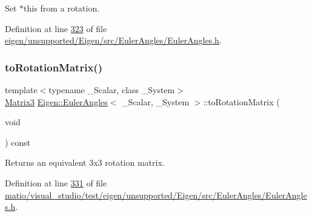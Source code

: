 Set {\ttfamily $\ast$this} from a rotation. 

Definition at line \hyperlink{eigen_2unsupported_2_eigen_2src_2_euler_angles_2_euler_angles_8h_source_l00323}{323} of file \hyperlink{eigen_2unsupported_2_eigen_2src_2_euler_angles_2_euler_angles_8h_source}{eigen/unsupported/\+Eigen/src/\+Euler\+Angles/\+Euler\+Angles.\+h}.

\mbox{\label{class_eigen_1_1_euler_angles_a11ec16b3ed918fac62d295012ec4e2ac}} 
\subsubsection{\texorpdfstring{to\+Rotation\+Matrix()}{toRotationMatrix()}\hspace{0.1cm}{\footnotesize\ttfamily [1/2]}}
{\footnotesize\ttfamily template$<$typename \+\_\+\+Scalar, class \+\_\+\+System$>$ \\
\hyperlink{class_eigen_1_1_euler_angles_ad0f0ee8240849b0f7d028695849cdbad}{Matrix3} \hyperlink{class_eigen_1_1_euler_angles}{Eigen\+::\+Euler\+Angles}$<$ \+\_\+\+Scalar, \+\_\+\+System $>$\+::to\+Rotation\+Matrix (\begin{DoxyParamCaption}\item[{void}]{ }\end{DoxyParamCaption}) const\hspace{0.3cm}{\ttfamily [inline]}}

\begin{DoxyReturn}{Returns}
an equivalent 3x3 rotation matrix. 
\end{DoxyReturn}


Definition at line \hyperlink{matio_2visual__studio_2test_2eigen_2unsupported_2_eigen_2src_2_euler_angles_2_euler_angles_8h_source_l00331}{331} of file \hyperlink{matio_2visual__studio_2test_2eigen_2unsupported_2_eigen_2src_2_euler_angles_2_euler_angles_8h_source}{matio/visual\+\_\+studio/test/eigen/unsupported/\+Eigen/src/\+Euler\+Angles/\+Euler\+Angles.\+h}.

\mbox{\label{class_eigen_1_1_euler_angles_a11ec16b3ed918fac62d295012ec4e2ac}} 
